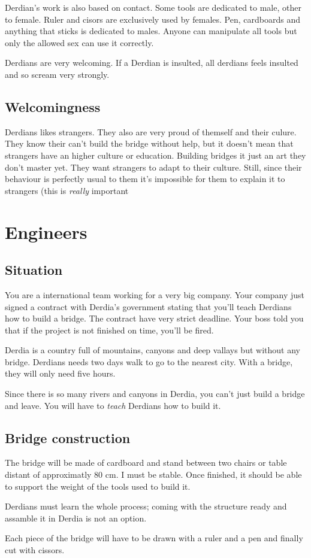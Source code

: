 \documentclass[11pt,a4paper]{article}
\begin{document}
Derdian's work is also based on contact.
Some tools are dedicated to male, other to female.
Ruler and cisors are exclusively used by females. Pen, cardboards and anything that sticks is dedicated to males.
Anyone can manipulate all tools but only the allowed sex can use it correctly.

Derdians are very welcoming. If a Derdian is insulted, all derdians feels insulted and so scream very strongly.
 
\subsection{Welcomingness}
 
Derdians likes strangers.
They also are very proud of themself and their culure.
They know their can't build the bridge without help, but it doesn't mean that strangers have an higher culture or education.
Building bridges it just an art they don't master yet.
They want strangers to adapt to their culture.
Still, since their behaviour is perfectly usual to them it's impossible for them to explain it to strangers (this is \emph{really} important

\pagebreak
 
\section{Engineers}

\subsection{Situation}

You are a international team working for a very big company.
Your company just signed a contract with Derdia's government stating that you'll teach Derdians how to build a bridge.
The contract have very strict deadline. Your boss told you that if the project is not finished on time, you'll be fired.

Derdia is a country full of mountains, canyons and deep vallays but without any bridge.
Derdians needs two days walk to go to the nearest city.
With a bridge, they will only need five hours.

Since there is so many rivers and canyons in Derdia, you can't just build a bridge and leave.
You will have to \emph{teach} Derdians how to build it.

\subsection{Bridge construction}

The bridge will be made of cardboard and stand between two chairs or table distant of approximatly 80 cm.
I must be stable. Once finished, it should be able to support the weight of the tools used to build it.

Derdians must learn the whole process; coming with the structure ready and assamble it in Derdia is not an option.

Each piece of the bridge will have to be drawn with a ruler and a pen and finally cut with cissors.
\end{document}
